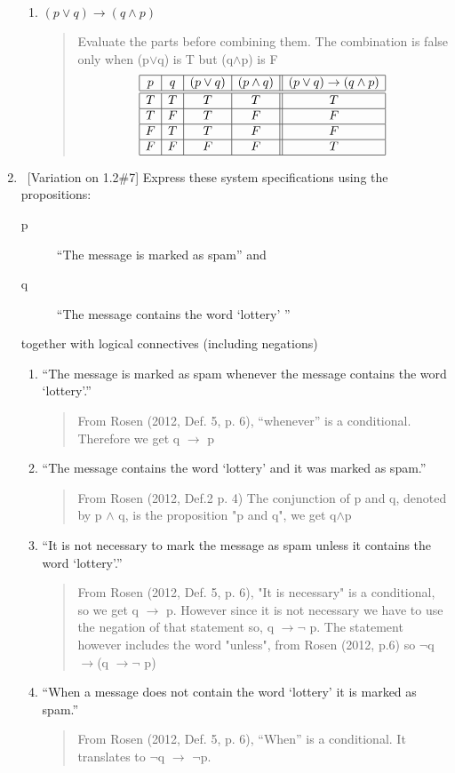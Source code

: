 \documentclass[10pt]{article}
\newcommand{\desclist}[1]{\begin{description}#1\end{description}}
\newcommand{\Answer}[1]{\begin{quote}{\color{blue}#1}\end{quote}}
\begin{document}
\begin{enumerate}
\begin{enumerate}
\item $ (p \vee  q) \rightarrow (q \wedge p)$\qquad [10 points]
\Answer{Evaluate the parts before combining them. The combination is false only when (p$\vee$q) is T but (q$\wedge$p) is F
$$
\begin{array}{|c|c|c|c||c|}
\hline
p & q & (p\vee q) & (p \wedge q) & (p \vee  q) \rightarrow (q \wedge p) \\
\hline
\hline
T & T & T & T & T\\
\hline
T & F & T & F & F\\
\hline
F & T & T & F & F\\
\hline
F & F & F & F & T\\
\hline
\end{array}
$$
}

\end{enumerate}

\item \ [Variation on 1.2\#7]  
Express these system specifications using the propositions:
\desclist{
\item [p] ``The message is marked as spam'' and 
\item [q] ``The message contains the word `lottery' '' 
}
together with logical connectives (including negations)
\begin{enumerate}
\item ``The message is marked as spam whenever the message contains the word `lottery'.''\qquad [5 points]
\Answer{From Rosen (2012, Def. 5, p. 6), “whenever” is a conditional. Therefore we get q $\rightarrow$ p}

\item  ``The message contains the word `lottery' and it was marked as spam.''\qquad [5 points]
\Answer{From Rosen (2012, Def.2 p. 4)  The conjunction of p and q, denoted by p $\wedge$ q, is the proposition "p and q", we get q$\wedge$p }

\item ``It is not necessary to mark the message as spam unless it contains the word `lottery'.''\qquad [5 points]
\Answer{From Rosen (2012, Def. 5, p. 6), "It is necessary" is a conditional, so we get q $\rightarrow$ p. However since it is not necessary we have to use the negation of that statement so, q $\rightarrow\lnot$ p. The statement however includes the word "unless", from Rosen (2012, p.6) so $\lnot$q $\rightarrow$(q $\rightarrow\lnot$ p)}

\item ``When a message does not contain the word `lottery' it is marked as spam.'' \qquad [5 points]
\Answer{From Rosen (2012, Def. 5, p. 6), “When” is a conditional. It translates to $\lnot$q $\rightarrow$ $\lnot$p.}


\end{enumerate}
\end{enumerate}
\end{document}
